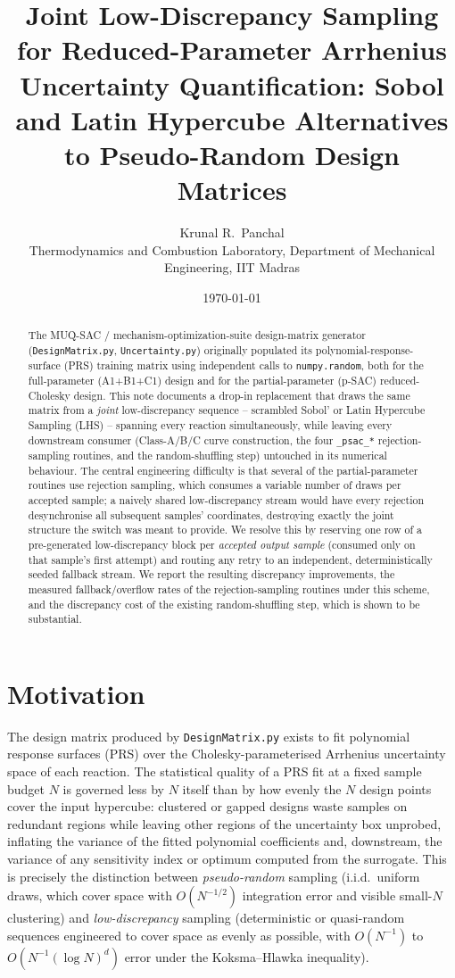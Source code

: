 \documentclass[11pt]{article}
\title{Joint Low-Discrepancy Sampling for Reduced-Parameter Arrhenius\\
Uncertainty Quantification: Sobol and Latin Hypercube Alternatives\\
to Pseudo-Random Design Matrices}
\author{Krunal R.\ Panchal \\ \small Thermodynamics and Combustion Laboratory, Department of Mechanical Engineering, IIT Madras}
\date{\today}
\newcommand{\code}[1]{\texttt{#1}}
\begin{document}
\maketitle

\begin{abstract}
The MUQ-SAC / mechanism-optimization-suite design-matrix generator (\code{DesignMatrix.py}, \code{Uncertainty.py}) originally populated its polynomial-response-surface (PRS) training matrix using independent calls to \code{numpy.random}, both for the full-parameter (A1+B1+C1) design and for the partial-parameter (p-SAC) reduced-Cholesky design. This note documents a drop-in replacement that draws the same matrix from a \emph{joint} low-discrepancy sequence -- scrambled Sobol' or Latin Hypercube Sampling (LHS) -- spanning every reaction simultaneously, while leaving every downstream consumer (Class-A/B/C curve construction, the four \code{\_psac\_*} rejection-sampling routines, and the random-shuffling step) untouched in its numerical behaviour. The central engineering difficulty is that several of the partial-parameter routines use rejection sampling, which consumes a variable number of draws per accepted sample; a naively shared low-discrepancy stream would have every rejection desynchronise all subsequent samples' coordinates, destroying exactly the joint structure the switch was meant to provide. We resolve this by reserving one row of a pre-generated low-discrepancy block per \emph{accepted output sample} (consumed only on that sample's first attempt) and routing any retry to an independent, deterministically seeded fallback stream. We report the resulting discrepancy improvements, the measured fallback/overflow rates of the rejection-sampling routines under this scheme, and the discrepancy cost of the existing random-shuffling step, which is shown to be substantial.
\end{abstract}

\tableofcontents

\section{Motivation}

The design matrix produced by \code{DesignMatrix.py} exists to fit polynomial response surfaces (PRS) over the Cholesky-parameterised Arrhenius uncertainty space of each reaction. The statistical quality of a PRS fit at a fixed sample budget $N$ is governed less by $N$ itself than by how evenly the $N$ design points cover the input hypercube: clustered or gapped designs waste samples on redundant regions while leaving other regions of the uncertainty box unprobed, inflating the variance of the fitted polynomial coefficients and, downstream, the variance of any sensitivity index or optimum computed from the surrogate. This is precisely the distinction between \emph{pseudo-random} sampling (i.i.d.\ uniform draws, which cover space with $O(N^{-1/2})$ integration error and visible small-$N$ clustering) and \emph{low-discrepancy} sampling (deterministic or quasi-random sequences engineered to cover space as evenly as possible, with $O(N^{-1})$ to $O(N^{-1}(\log N)^{d})$ error under the Koksma--Hlawka inequality).
\end{document}
